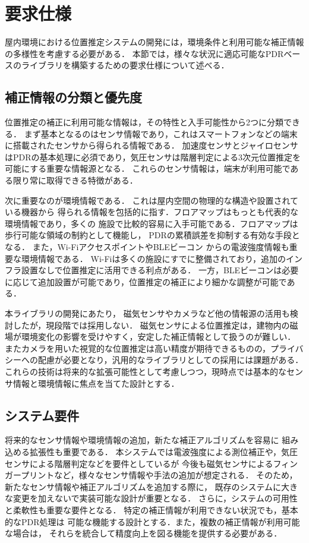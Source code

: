 

\section{要求仕様}

屋内環境における位置推定システムの開発には，環境条件と利用可能な補正情報の多様性を考慮する必要がある．
本節では，様々な状況に適応可能なPDRベースのライブラリを構築するための要求仕様について述べる．


\subsection{補正情報の分類と優先度}

位置推定の補正に利用可能な情報は，その特性と入手可能性から2つに分類できる．
まず基本となるのはセンサ情報であり，これはスマートフォンなどの端末に搭載されたセンサから得られる情報である．
加速度センサとジャイロセンサはPDRの基本処理に必須であり，気圧センサは階層判定による3次元位置推定を可能にする重要な情報源となる．
これらのセンサ情報は，端末が利用可能である限り常に取得できる特徴がある．

次に重要なのが環境情報である．
これは屋内空間の物理的な構造や設置されている機器から
得られる情報を包括的に指す．フロアマップはもっとも代表的な環境情報であり，多くの
施設で比較的容易に入手可能である．フロアマップは歩行可能な領域の制約として機能し，
PDRの累積誤差を抑制する有効な手段となる．
また，Wi-FiアクセスポイントやBLEビーコン
からの電波強度情報も重要な環境情報である．
Wi-Fiは多くの施設にすでに整備されており，追加のインフラ設置なしで位置推定に活用できる利点がある．
一方，BLEビーコンは必要に応じて追加設置が可能であり，位置推定の補正により細かな調整が可能である．

本ライブラリの開発にあたり，
磁気センサやカメラなど他の情報源の活用も検討したが，現段階では採用しない．
磁気センサによる位置推定は，建物内の磁場が環境変化の影響を受けやすく，安定した補正情報として扱うのが難しい．
またカメラを用いた視覚的な位置推定は高い精度が期待できるものの，プライバシーへの配慮が必要となり，汎用的なライブラリとしての採用には課題がある．
これらの技術は将来的な拡張可能性として考慮しつつ，現時点では基本的なセンサ情報と環境情報に焦点を当てた設計とする．

\subsection{システム要件}

将来的なセンサ情報や環境情報の追加，新たな補正アルゴリズムを容易に
組み込める拡張性も重要である．
本システムでは電波強度による測位補正や，気圧センサによる階層判定などを要件としているが
今後も磁気センサによるフィンガープリントなど，様々なセンサ情報や手法の追加が想定される．
そのため，新たなセンサ情報や補正アルゴリズムを追加する際に，
既存のシステムに大きな変更を加えないで実装可能な設計が重要となる．
さらに，システムの可用性と柔軟性も重要な要件となる．
特定の補正情報が利用できない状況でも，基本的なPDR処理は
可能な機能する設計とする．また，複数の補正情報が利用可能な場合は，
それらを統合して精度向上を図る機能を提供する必要がある．




